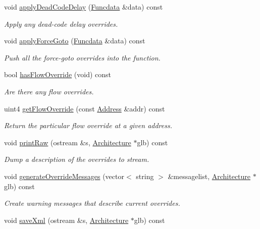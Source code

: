 \begin{DoxyCompactItemize}
void \mbox{\hyperlink{class_override_ae1c4b43226ff096764f6d98f325ae759}{apply\+Dead\+Code\+Delay}} (\mbox{\hyperlink{class_funcdata}{Funcdata}} \&data) const
\begin{DoxyCompactList}\small\item\em Apply any dead-\/code delay overrides. \end{DoxyCompactList}\item 
void \mbox{\hyperlink{class_override_a7920e3b6030b283342a0da67fbc69505}{apply\+Force\+Goto}} (\mbox{\hyperlink{class_funcdata}{Funcdata}} \&data) const
\begin{DoxyCompactList}\small\item\em Push all the force-\/goto overrides into the function. \end{DoxyCompactList}\item 
bool \mbox{\hyperlink{class_override_aea606077c566aa82541128919c4ba5e2}{has\+Flow\+Override}} (void) const
\begin{DoxyCompactList}\small\item\em Are there any flow overrides. \end{DoxyCompactList}\item 
uint4 \mbox{\hyperlink{class_override_ab15cf0bc049c1faf14ad8ddbba898821}{get\+Flow\+Override}} (const \mbox{\hyperlink{class_address}{Address}} \&addr) const
\begin{DoxyCompactList}\small\item\em Return the particular flow override at a given address. \end{DoxyCompactList}\item 
void \mbox{\hyperlink{class_override_a8892cbe3b73a6deb23345088f86f5593}{print\+Raw}} (ostream \&s, \mbox{\hyperlink{class_architecture}{Architecture}} $\ast$glb) const
\begin{DoxyCompactList}\small\item\em Dump a description of the overrides to stream. \end{DoxyCompactList}\item 
void \mbox{\hyperlink{class_override_a6d27df21e6a0448729260d0179d35500}{generate\+Override\+Messages}} (vector$<$ string $>$ \&messagelist, \mbox{\hyperlink{class_architecture}{Architecture}} $\ast$glb) const
\begin{DoxyCompactList}\small\item\em Create warning messages that describe current overrides. \end{DoxyCompactList}\item 
void \mbox{\hyperlink{class_override_ab983057b1943546a6ed8ef1b2bbd3627}{save\+Xml}} (ostream \&s, \mbox{\hyperlink{class_architecture}{Architecture}} $\ast$glb) const

\end{DoxyCompactItemize}
